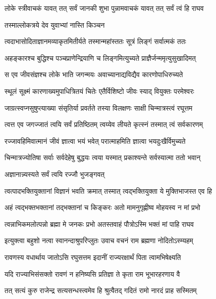 \twolineshloka
{लोके स्त्रीवाचकं यावत् तत् सर्वं जानकी शुभा}
{पुन्नामवाचकं यावत् तत् सर्वं त्वं हि राघव} %

\onelineshloka
{तस्माल्लोकत्रये देव युवाभ्यां नास्ति किञ्चन} %

\twolineshloka
{त्वदाभासोदिताज्ञानमव्याकृतमितीर्यते}
{तस्मान्महांस्ततः सूत्रं लिङ्गं सर्वात्मकं ततः} %

\twolineshloka
{अहङ्कारश्च बुद्धिश्च पञ्चप्राणेन्द्रियाणि च}
{लिङ्गमित्युच्यते प्राज्ञैर्जन्ममृत्युसुखादिमत्} %

\twolineshloka
{स एव जीवसंज्ञश्च लोके भाति जगन्मयः}
{अवाच्यानाद्यविद्यैव कारणोपाधिरुच्यते} %

\twolineshloka
{स्थूलं सूक्ष्मं कारणाख्यमुपाधित्रितयं चितेः}
{एतैर्विशिष्टो जीवः स्याद् वियुक्तः परमेश्वरः} %

\twolineshloka
{जाग्रत्स्वप्नसुषुप्त्याख्या संसृतिर्या प्रवर्तते}
{तस्या विलक्षणः साक्षी चिन्मात्रस्त्वं रघूत्तम} %

\twolineshloka
{त्वत्त एव जगज्जातं त्वयि सर्वं प्रतिष्ठितम्}
{त्वय्येव लीयते कृत्स्नं तस्मात् त्वं सर्वकारणम्} %

\twolineshloka
{रज्जावहिमिवात्मानं जीवं ज्ञात्वा भयं भवेत्}
{परात्माहमिति ज्ञात्वा भयदुःखैर्विमुच्यते} %

\twolineshloka
{चिन्मात्रज्योतिषा सर्वाः सर्वदेहेषु बुद्धयः}
{त्वया यस्मात् प्रकाश्यन्ते सर्वस्यात्मा ततो भवान्} %

\onelineshloka
{अज्ञानान्न्यस्यते सर्वं त्वयि रज्जौ भुजङ्गवत्} %

\twolineshloka
{त्वत्पादभक्तियुक्तानां विज्ञानं भवति क्रमात्}
{तस्मात् त्वद्भक्तियुक्ता ये मुक्तिभाजस्त एव हि} %

\twolineshloka
{अहं त्वद्भक्तभक्तानां तद्भक्तानां च किङ्करः}
{अतो मामनुगृह्णीष्व मोहयस्व न मां प्रभो} %

\twolineshloka
{त्वन्नाभिकमलोत्पन्नो ब्रह्मा मे जनकः प्रभो}
{अतस्तवाहं पौत्रोऽस्मि भक्तं मां पाहि राघव} %

\twolineshloka
{इत्युक्त्वा बहुशो नत्वा स्वानन्दाश्रुपरिप्लुतः}
{उवाच वचनं राम ब्रह्मणा नोदितोऽस्म्यहम्} %

\twolineshloka
{रावणस्य वधार्थाय जातोऽसि रघुसत्तम}
{इदानीं राज्यरक्षार्थं पिता त्वामभिषेक्ष्यति} %

\twolineshloka
{यदि राज्याभिसंसक्तो रावणं न हनिष्यसि}
{प्रतिज्ञा ते कृता राम भूभारहरणाय वै} %

\twolineshloka
{तत् सत्यं कुरु राजेन्द्र सत्यसन्धस्त्वमेव हि}
{श्रुत्वैतद् गदितं रामो नारदं प्राह सस्मितम्} %

